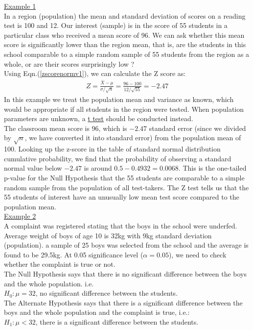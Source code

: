 \underline{Example 1}\\
In a region (population) the mean and standard deviation of scores on a reading test is 100 and 12. Our interest (sample) is in the score of 55 students in a particular class who received a mean score of 96. We can ask whether this mean score is significantly lower than the region mean, that is, are the students in this school comparable to a simple random sample of 55 students from the region as a whole, or are their scores surprisingly low ?\\

Using Eqn.(\ref{zscorenormv1}), we can calculate the Z score as:
\begin{eqnarray}
Z = \frac{\bar{X} - \mu}{\sigma/\sqrt{n}} = \frac{96-100}{12/\sqrt{55}} = -2.47
\end{eqnarray}
In this example we treat the population mean and variance as known, which would be appropriate if all students in the region were tested. When population parameters are unknown, a \underline{t test} should be conducted instead.\\

The classroom mean score is 96, which is $-2.47$ standard error (since we divided by $\sqrt{n}$, we have converted it into standard error) from the population mean of 100. Looking up the z-score in the table of standard normal distribution cumulative probability, we find that the probability of observing a standard normal value below $-2.47$ is around $0.5 - 0.4932 = 0.0068$. This is the one-tailed p-value for the Null Hypothesis that the 55 students are comparable to a simple random sample from the population of all test-takers. The Z test tells us that the 55 students of interest have an unusually low mean test score compared to the population mean. \\

\underline{Example 2}\\

A complaint was registered stating that the boys in the school were underfed. Average weight of boys of age 10 is 32kg with 9kg standard deviation (population). a sample of 25 boys was selected from the school and the average is found to be 29.5kg. At 0.05 significance level ($\alpha = 0.05$), we need to check whether the complaint is true or not.\\

The Null Hypothesis says that there is no significant difference between the boys and the whole population. i.e.\\
$H_0:\mu = 32$, no significant difference between the students.\\
The Alternate Hypothesis says that there is a significant difference between the boys and the whole population and the complaint is true, i.e.:\\
$H_1:\mu < 32$, there is a significant difference between the students.\\


